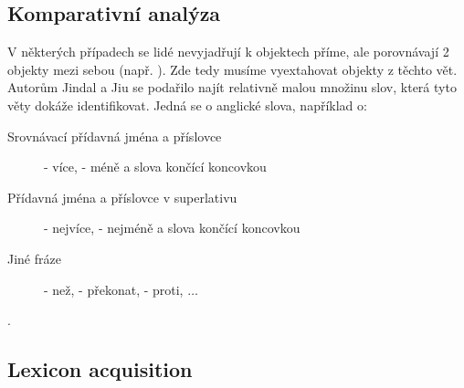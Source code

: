 \subsection{Komparativní analýza}
V některých případech se lidé nevyjadřují k objektech příme, ale porovnávají 2 objekty mezi sebou (např. ). Zde tedy musíme vyextahovat objekty z těchto vět. Autorům Jindal a Jiu se podařilo najít relativně malou množinu slov, která tyto věty dokáže identifikovat. \cite{comparative} Jedná se o anglické slova, například o: \cite{comparative} 
\begin{description}
	\item[Srovnávací přídavná jména a příslovce]  - více,  - méně a slova končící koncovkou 

	\item[Přídavná jména a příslovce v superlativu]   - nejvíce,  - nejméně a slova končící koncovkou 
	
	\item[Jiné fráze]  - než,  - překonat,  - proti, $\dots$
\end{description}
. \cite[překlad vlastní]{comparative}


\subsection{Lexicon acquisition}
\blind[2]
		


